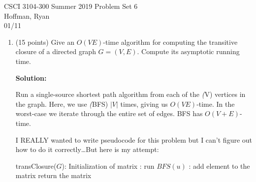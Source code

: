 \documentclass{article}
\begin{document}
CSCI 3104-300 Summer 2019 \hfill Problem Set 6 \\
Hoffman, Ryan \\
01/11

\hrulefill

\vspace{-3mm}
\begin{enumerate}
    \item (15 points) Give an $O(VE)$-time algorithm for computing the transitive closure of a directed graph $G=(V,E)$.  
    Compute its asymptotic running time.\par
    \textbf{Solution:}\par
    Run a single-source shortest path algorithm from each of the \textit(V) vertices in the graph. Here, we use \textit(BFS) $|V|$ times, giving us
    $O(VE)$-time. In the worst-case we iterate through the entire set of edges. BFS has $O(V+E)$-time.\par
    I REALLY wanted to write pseudocode for this problem but I can't figure out how to do it correctly\dots But here is my attempt:\par
    \begin{algorithm}
        \caption{}
        \begin{algorithmic}[1]
        \State transClosure($G$):
            \State Initialization of matrix  
            :
                \State run $BFS(u)$
                :
                \State add element to the matrix
                \EndFor
            \State return the matrix    
            \EndFor
        \end{algorithmic}
    \end{algorithm}
    \pagebreak
    

\end{enumerate}
\end{document}
